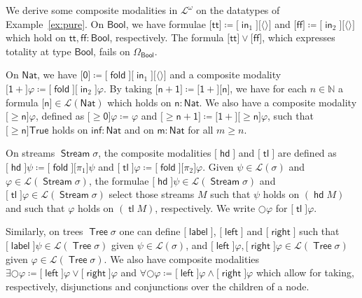 \documentclass[%
  a4paper,
  UKenglish,
  cleveref,
  autoref,
  thm-restate,
  numberwithinsect,
]{lipics-v2021}
\newcommand\deq\coloneqq
\newcommand\pair[1]{{\langle #1\rangle}}
\newcommand\NN{\mathbb{N}}
\newcommand\temp[1]{\mathsf{#1}}
\newcommand\True{\temp{True}}
\newcommand\Next{\mathord{\bigcirc}}
\newcommand\term[1]{\mathsf{#1}}
\newcommand\type[1]{\term{#1}}
\newcommand\inj{\mathop{\term{in}}}
\newcommand\fold{\mathop{\term{fold}}}
\newcommand\hd{\mathop{\term{hd}}}
\newcommand\tl{\mathop{\term{tl}}}
\newcommand\lbl{\mathop{\term{label}}}
\newcommand\lft{\mathop{\term{left}}}
\newcommand\rght{\mathop{\term{right}}}
\newcommand\Bool{\type{Bool}}
\newcommand\Nat{\type{Nat}}
\newcommand\Stream{\mathop{\type{Stream}}}
\newcommand\Tree{\mathop{\type{Tree}}}
\newcommand\true{\term{tt}}
\newcommand\false{\term{ff}}
\newcommand\PTbis{\sigma}	%
\newcommand\Lang{\mathcal{L}}
\newcommand\form[1]{\lbrack #1 \rbrack}
\begin{document}
\begin{example}
\label{ex:form:mod}
We derive some composite modalities in $\Lang^\omega$ on the datatypes of
Example~\ref{ex:pure}.
On $\Bool$, we have formulae $\form\true \deq \form{\inj_1}\form{\pair{}}$
and $\form\false \deq \form{\inj_2}\form{\pair{}}$ which hold
on $\true, \false \colon \Bool$, respectively.
The formula $\form\true \lor \form\false$,
which expresses totality at type $\Bool$,
fails on $\Omega_\Bool$.

On $\Nat$, we have $\form{\term 0} \deq \form\fold \form{\inj_1} \form{\pair{}}$
and a composite modality
$\form{\term{1+}}\varphi \deq \form\fold \form{\inj_2}\varphi$.
By taking $\form{\term{n+1}} \deq \form{\term{1+}}\form{\term n}$,
we have for each $n \in \NN$ a formula $\form{\term{n}} \in \Lang(\Nat)$
which holds on $\term n \colon \Nat$.
We also have a composite modality $\form{\geq \term{n}} \varphi$,
defined as $\form{\geq \term{0}}\varphi \deq \varphi$
and $\form{\geq \term{n+1}} \deq \form{\term{1+}}\form{\geq \term{n}} \varphi$,
such that $\form{\geq \term{n}}\True$
holds on $\term{inf} \colon \Nat$ and on $\term m \colon \Nat$ for all $m \geq n$.

On streams $\Stream\PTbis$, 
the composite modalities $\form\hd$ and $\form\tl$
are defined as $\form\hd \psi \deq \form\fold \form{\pi_1} \psi$
and $\form\tl \varphi \deq \form\fold \form{\pi_2} \varphi$.
Given $\psi \in \Lang(\PTbis)$ and $\varphi \in \Lang(\Stream\PTbis)$,
the formulae $\form\hd\psi \in \Lang(\Stream\PTbis)$
and $\form\tl\varphi \in \Lang(\Stream\PTbis)$
select those streams $M$ such that $\psi$ holds on $(\hd M)$
and such that $\varphi$ holds on $(\tl M)$, respectively.
We write $\Next\varphi$ for $\form\tl\varphi$.

Similarly, on trees $\Tree\PTbis$
one can define $\form\lbl$, $\form\lft$ and $\form\rght$
such that
$\form\lbl\psi \in \Lang(\Tree\PTbis)$
given $\psi \in \Lang(\PTbis)$,
and
$\form\lft\varphi, \form\rght\varphi \in \Lang(\Tree\PTbis)$
given $\varphi \in \Lang(\Tree\PTbis)$.
We also have composite modalities
$\exists\Next \varphi \deq \form\lft \varphi \lor \form\rght\varphi$
and
$\forall\Next \varphi \deq \form\lft \varphi \land \form\rght\varphi$
which allow for taking, respectively,
disjunctions and conjunctions over the children of a node.
\lipicsEnd
\end{example}
\end{document}

